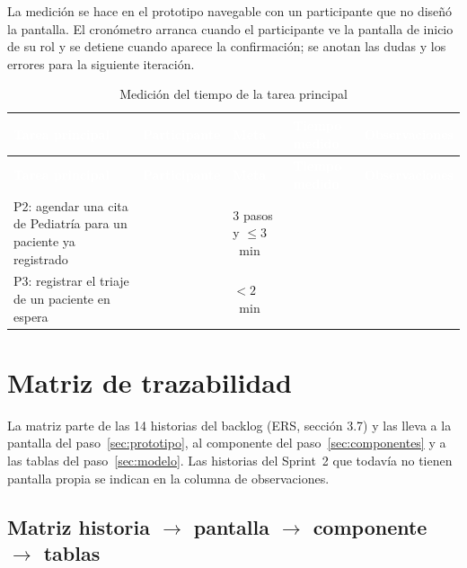 \documentclass[11pt,a4paper]{article}
\newcommand{\cab}[1]{\textcolor{white}{\textbf{#1}}}
\begin{document}
La medición se hace en el prototipo navegable con un participante que no diseñó la pantalla.
El cronómetro arranca cuando el participante ve la pantalla de inicio de su rol y se detiene
cuando aparece la confirmación; se anotan las dudas y los errores para la siguiente iteración.

\begin{xltabular}{\linewidth}{|L|P{2.6cm}|P{2cm}|P{2cm}|L|}
  \caption{Medición del tiempo de la tarea principal}\label{tab:tiempo}\\
  \hline
  \cab{Tarea principal} & \cab{Participante} & \cab{Meta} & \cab{Tiempo medido} & \cab{Observaciones} \\ \hline
  \endfirsthead
  \hline
  \cab{Tarea principal} & \cab{Participante} & \cab{Meta} & \cab{Tiempo medido} & \cab{Observaciones} \\ \hline
  \endhead
  P2: agendar una cita de Pediatría para un paciente ya registrado & & 3 pasos y $\leq 3$~min & & \\ \hline
  P3: registrar el triaje de un paciente en espera & & $< 2$~min & & \\ \hline
\end{xltabular}

\newpage
\section{Matriz de trazabilidad}\label{sec:trazabilidad}

La matriz parte de las 14 historias del backlog (ERS, sección 3.7) y las lleva a la pantalla
del paso~\ref{sec:prototipo}, al componente del paso~\ref{sec:componentes} y a las tablas del
paso~\ref{sec:modelo}. Las historias del Sprint~2 que todavía no tienen pantalla propia se
indican en la columna de observaciones.

\subsection{\texorpdfstring{Matriz historia $\rightarrow$ pantalla $\rightarrow$ componente $\rightarrow$ tablas}{Matriz historia, pantalla, componente y tablas}}
\end{document}
